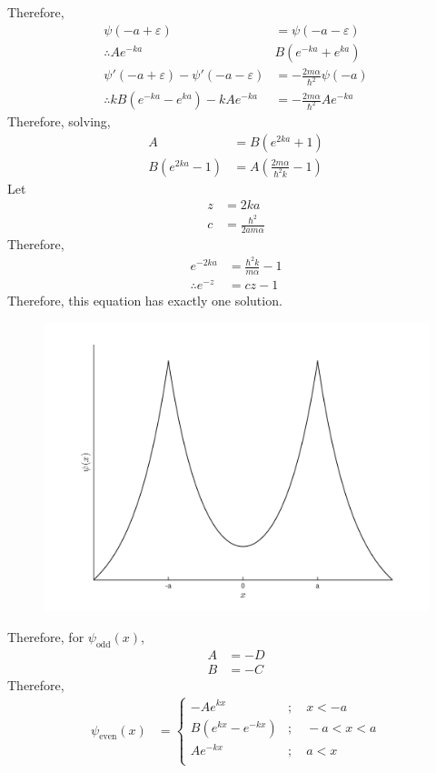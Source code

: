 \documentclass[titlepage, fleqn, a4paper, 12pt, twoside]{article}
\theoremstyle{definition}
\theoremstyle{theorem}
\begin{document}
Therefore,
\begin{align*}
	\psi(-a + \varepsilon) &= \psi(-a - \varepsilon)\\
	\therefore A e^{-k a} & B \left( e^{-k a} + e^{k a} \right)\\
	\psi'(-a + \varepsilon) - \psi'(-a - \varepsilon) &= -\frac{2 m \alpha}{\hbar^2} \psi(-a)\\
	\therefore k B \left( e^{-k a} - e^{k a} \right) - k A e^{-k a} &= -\frac{2 m \alpha}{\hbar^2} A e^{-k a}
\end{align*}
Therefore, solving,
\begin{align*}
	A &= B \left( e^{2 k a} + 1 \right)\\
	B \left( e^{2 k a} - 1 \right) &= A \left( \frac{2 m \alpha}{\hbar^2 k} - 1 \right)
\end{align*}
Let
\begin{align*}
	z &= 2 k a\\
	c &= \frac{\hbar^2}{2 a m \alpha}
\end{align*}
Therefore,
\begin{align*}
	e^{-2 k a} &= \frac{\hbar^2 k}{m \alpha} - 1\\
	\therefore e^{-z} &= c z - 1
\end{align*}
Therefore, this equation has exactly one solution.
\begin{figure}[H]
	\centering
	\includegraphics[width = \textwidth]{fig-even_solution_for_double_delta_barrier.pdf}
\end{figure}

Therefore, for $\psi_{\text{odd}}(x)$,
\begin{align*}
	A &= -D\\
	B &= -C
\end{align*}
Therefore,
\begin{align*}
	\psi_{\text{even}}(x) &=
		\begin{cases}
			-A e^{k x} &;\quad x < -a\\
			B \left( e^{k x} - e^{-k x} \right) &;\quad -a < x < a\\
			A e^{-k x} &;\quad a < x\\
		\end{cases}
\end{align*}
\end{document}
